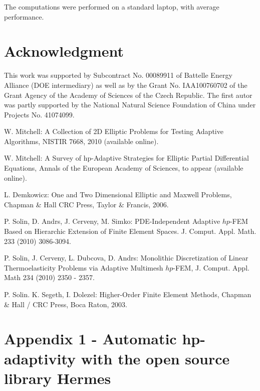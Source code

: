 \documentclass[12pt]{elsarticle}
\begin{document}
The computations were performed on a standard laptop, with average performance.

\section{Acknowledgment}

This work was supported by Subcontract No. 00089911 of Battelle
Energy Alliance (DOE intermediary) as well as by the
Grant No. IAA100760702 of the Grant Agency of the Academy
of Sciences of the Czech Republic. The first autor was partly
supported by the National Natural Science Foundation
of China under Projects No. 41074099.



\begin{thebibliography}{[KLR73]}

W. Mitchell: A Collection of 2D Elliptic Problems for
Testing Adaptive Algorithms, NISTIR 7668, 2010 (available online).

W. Mitchell: A Survey of hp-Adaptive Strategies for Elliptic Partial Differential Equations,
Annals of the European Academy of Sciences, to appear (available online).

L. Demkowicz: One and Two Dimensional Elliptic and Maxwell Problems,
Chapman \& Hall \/ CRC Press, Taylor \& Francis, 2006.


P. Solin, D. Andrs, J. Cerveny, M. Simko:
PDE-Independent Adaptive $hp$-FEM Based on Hierarchic Extension of Finite Element Spaces.
J. Comput. Appl. Math. 233 (2010) 3086-3094.

P. Solin, J. Cerveny, L. Dubcova, D. Andrs:
Monolithic Discretization of Linear Thermoelasticity Problems
via Adaptive Multimesh $hp$-FEM, J. Comput. Appl. Math 234 (2010) 2350 - 2357.

P. Solin. K. Segeth, I. Dolezel: Higher-Order Finite Element Methods, Chapman \& Hall
/ CRC Press, Boca Raton, 2003.
\end{thebibliography}

\section{Appendix 1 - Automatic hp-adaptivity with the open source library Hermes}
\end{document}

